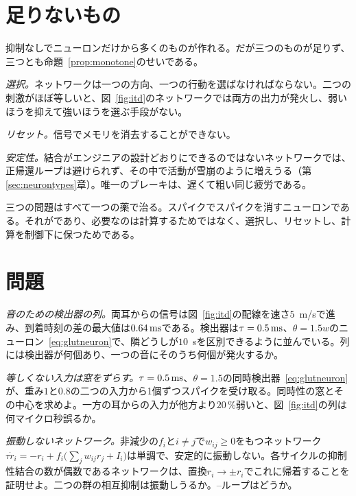 \section{足りないもの}

抑制なしでニューロンだけから多くのものが作れる。だが三つのものが足りず、三つとも命題~\ref{prop:monotone}のせいである。

\emph{選択。}ネットワークは一つの方向、一つの行動を選ばなければならない。二つの刺激がほぼ等しいと、図~\ref{fig:itd}のネットワークでは両方の出力が発火し、弱いほうを抑えて強いほうを選ぶ手段がない。

\emph{リセット。}信号でメモリを消去することができない。

\emph{安定性。}結合がエンジニアの設計どおりにできるのではないネットワークでは、正帰還ループは避けられず、その中で活動が雪崩のように増えうる（第\ref{sec:neurontypes}章）。唯一のブレーキは、遅くて粗い同じ疲労である。

三つの問題はすべて一つの薬で治る。スパイクでスパイクを消すニューロンである。それがであり、必要なのは計算するためではなく、選択し、リセットし、計算を制御下に保つためである。

\section{問題}

\begin{exercise}[\lvlA]
\label{ex:02:1}
\emph{音のための検出器の列。}両耳からの信号は図~\ref{fig:itd}の配線を速さ$5$~m/sで進み、到着時刻の差の最大値は$0.64\,\text{ms}$である。検出器は$\tau=0.5\,\text{ms}$、$\theta=1.5w$のニューロン~\eqref{eq:glutneuron}で、隣どうしが$10$~\textmu sを区別できるように並んでいる。列には検出器が何個あり、一つの音にそのうち何個が発火するか。
\end{exercise}

\begin{exercise}[\lvlB]
\label{ex:02:2}
\emph{等しくない入力は窓をずらす。}$\tau=0.5\,\text{ms}$、$\theta=1.5$の同時検出器~\eqref{eq:glutneuron}が、重み$1$と$0.8$の二つの入力から1個ずつスパイクを受け取る。同時性の窓とその中心を求めよ。一方の耳からの入力が他方より$20\,\%$弱いと、図~\ref{fig:itd}の列は何マイクロ秒誤るか。
\end{exercise}

\begin{exercise}[\lvlB]
\label{ex:02:3}
\emph{振動しないネットワーク。}非減少の$f_i$と$i\ne j$で$w_{ij}\ge0$をもつネットワーク$\tau\dot r_i=-r_i+f_i\bigl(\textstyle\sum_jw_{ij}r_j+I_i\bigr)$は単調で、安定的に振動しない。各サイクルの抑制性結合の数が偶数であるネットワークは、置換$r_i\to\pm r_i$でこれに帰着することを証明せよ。二つの群の相互抑制は振動しうるか。--ループはどうか。
\end{exercise}

